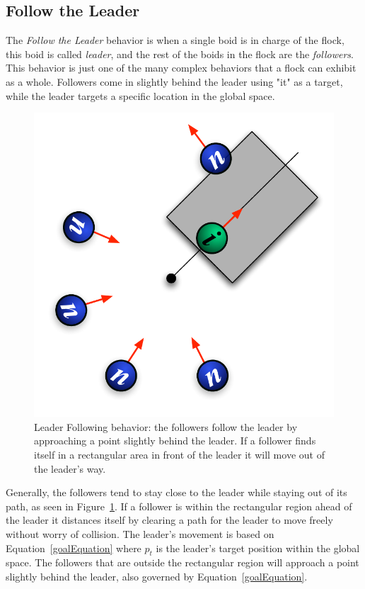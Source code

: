 \subsection{Follow the Leader}
The \textit{Follow the Leader} behavior is when a single boid is in charge of the flock, this boid is called \textit{leader}, and the rest of the boids in the flock are the \textit{followers}. This behavior is just one of the many complex behaviors that a flock can exhibit as a whole. Followers come in slightly behind the leader using "it" as a target, while the leader targets a specific location in the global space.

\begin{figure}[htbp]
\begin{center}
\includegraphics[scale=0.75]{figures/leaderFollowing.pdf}
\caption{Leader Following behavior: the followers follow the leader by approaching a point slightly behind the leader. If a follower finds itself in a rectangular area in front of the leader it will move out of the leader's way.}
\label{leaderPDF}
\end{center}
\end{figure}

Generally, the followers tend to stay close to the leader while staying out of its path, as seen in Figure~\ref{leaderPDF}. If a follower is within the rectangular region ahead of the leader it distances itself by clearing a path for the leader to move freely without worry of collision. The leader's movement is  based on Equation~\ref{goalEquation} where $p_t$ is the leader's target position within the global space. The followers that are outside the rectangular region will approach a point slightly behind the leader, also governed by Equation~\ref{goalEquation}.

